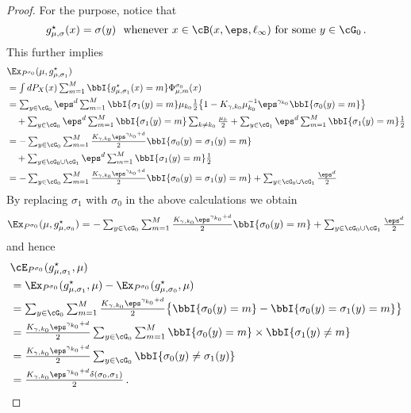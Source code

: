 \begin{proof}
    
For the purpose, notice that
\[
\textstyle g^\star_{\mu, \sigma}(x) = 
    \sigma(y)  ~~\text{whenever} ~ x \in\cB(x, \eps, \ell_{\infty})~ \text{for some}   ~  y \in \cG_0\,.
\] This further implies 
\[
\begin{aligned}
     & \Ex_{P^{\sigma_0}}(\mu, g^\star_{\mu, \sigma_1})\\
    & \textstyle = \int dP_X(x) \sum_{m = 1}^M \bbI\{ g^\star_{\mu, \sigma_1}(x) = m \} \Phi_{\mu, m}^{\sigma_0}(x)\\
    & \textstyle = \sum_{y \in \cG_0} \eps^d \sum_{m = 1}^M  \bbI\{ \sigma_1(y) = m \}  \mu_{k_0} \frac{1}{2} \big \{1 - K_{\gamma, k_0} \mu_{k_0}^{-1} \eps^{\gamma_{k_0}} \bbI\{ \sigma_0(y) = m \} \big\} \\
    & \textstyle \quad  + \sum_{y \in \cG_0} \eps^d \sum_{m = 1}^M \bbI\{ \sigma_1(y) = m \} \sum_{k \neq k_0}\frac{\mu_k}{2} + \sum_{y \in \cG_1} \eps^d \sum_{m = 1}^M \bbI\{ \sigma_1(y) = m \} \frac{1}{2} \\
    & \textstyle =  -\sum_{y \in \cG_0}  \sum_{m = 1}^M    \frac{ K_{\gamma, k_0} \eps^{\gamma_{k_0} + d}}{2}   \bbI\{ \sigma_0(y) = \sigma_1(y) = m \} \\
    & \textstyle \quad + \sum_{y \in \cG_0\cup \cG_1} \eps^d \sum_{m = 1}^M \bbI\{ \sigma_1(y) = m \} \frac{1}{2}\\
    & \textstyle =  -\sum_{y \in \cG_0}  \sum_{m = 1}^M  \frac{ K_{\gamma, k_0} \eps^{\gamma_{k_0} + d}}{2}   \bbI\{ \sigma_0(y) = \sigma_1(y) = m \} +  \sum_{y \in \cG_0\cup \cG_1}   \frac{\eps^d}{2}\\
\end{aligned}
\] 
By replacing $\sigma_1$ with $\sigma_0$ in the above calculations we obtain 
\[
\textstyle\Ex_{P^{\sigma_0}}(\mu, g^\star_{\mu, \sigma_0})= -\sum_{y \in \cG_0}  \sum_{m = 1}^M  \frac{ K_{\gamma, k_0} \eps^{\gamma_{k_0} + d}}{2}   \bbI\{ \sigma_0(y) =  m \} +  \sum_{y \in \cG_0\cup \cG_1}   \frac{\eps^d}{2}
\]
and hence 
\[
\begin{aligned}
    & \cE_{P^{\sigma_0}}(g^\star_{\mu, \sigma_1}, \mu)\\
    & = \Ex_{P^{\sigma_0}}(g^\star_{\mu, \sigma_1}, \mu) - \Ex_{P^{\sigma_0}}(g^\star_{\mu, \sigma_0}, \mu)\\
    & = \textstyle \sum_{y \in \cG_0}  \sum_{m = 1}^M  \frac{ K_{\gamma, k_0} \eps^{\gamma_{k_0} + d}}{2}  \big\{ \bbI\{ \sigma_0(y) =  m \} -  \bbI\{ \sigma_0(y)  =\sigma_1(y) = m \}\big\}\\
    & = \textstyle \frac{ K_{\gamma, k_0} \eps^{\gamma_{k_0} + d}}{2}\sum_{y \in \cG_0}  \sum_{m = 1}^M   \bbI\{ \sigma_0(y) =  m \}\times \bbI\{ \sigma_1(y) \neq  m \} \\
    & = \textstyle \frac{ K_{\gamma, k_0} \eps^{\gamma_{k_0} + d}}{2}\sum_{y \in \cG_0}    \bbI\{ \sigma_0(y) \neq \sigma_1(y) \} \\
    & = \textstyle \frac{ K_{\gamma, k_0} \eps^{\gamma_{k_0} + d} \delta(\sigma_0, \sigma_1)}{2}   \,.
\end{aligned}
\] 
\end{proof}
